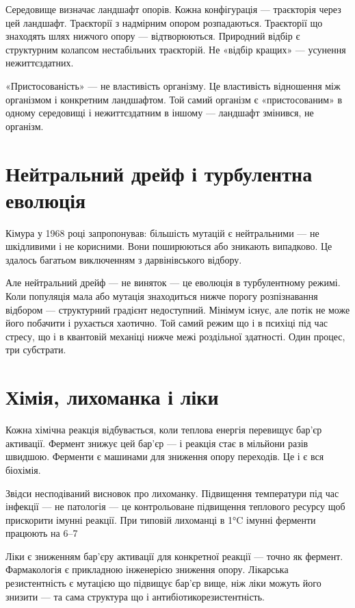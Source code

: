 \documentclass[12pt, a4paper, openany]{book}
\begin{document}
Середовище визначає ландшафт опорів. Кожна конфігурація — траєкторія через цей ландшафт. Траєкторії з надмірним опором розпадаються. Траєкторії що знаходять шлях нижчого опору — відтворюються. Природний відбір є структурним колапсом нестабільних траєкторій. Не «відбір кращих» — усунення нежиттєздатних.

«Пристосованість» — не властивість організму. Це властивість відношення між організмом і конкретним ландшафтом. Той самий організм є «пристосованим» в одному середовищі і нежиттєздатним в іншому — ландшафт змінився, не організм.

\section{Нейтральний дрейф і турбулентна еволюція}

Кімура у 1968 році запропонував: більшість мутацій є нейтральними — не шкідливими і не корисними. Вони поширюються або зникають випадково. Це здалось багатьом виключенням з дарвінівського відбору.

Але нейтральний дрейф — не виняток — це еволюція в турбулентному режимі. Коли популяція мала або мутація знаходиться нижче порогу розпізнавання відбором — структурний градієнт недоступний. Мінімум існує, але потік не може його побачити і рухається хаотично. Той самий режим що і в психіці під час стресу, що і в квантовій механіці нижче межі роздільної здатності. Один процес, три субстрати.

\section{Хімія, лихоманка і ліки}

Кожна хімічна реакція відбувається, коли теплова енергія перевищує бар'єр активації. Фермент знижує цей бар'єр — і реакція стає в мільйони разів швидшою. Ферменти є машинами для зниження опору переходів. Це і є вся біохімія.

Звідси несподіваний висновок про лихоманку. Підвищення температури під час інфекції — не патологія — це контрольоване підвищення теплового ресурсу щоб прискорити імунні реакції. При типовій лихоманці в 1°C імунні ферменти працюють на 6–7%

Ліки є зниженням бар'єру активації для конкретної реакції — точно як фермент. Фармакологія є прикладною інженерією зниження опору. Лікарська резистентність є мутацією що підвищує бар'єр вище, ніж ліки можуть його знизити — та сама структура що і антибіотикорезистентність.
\end{document}
